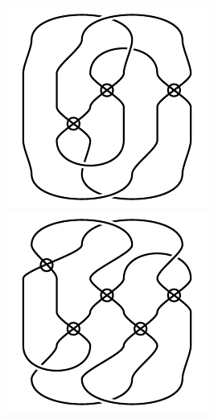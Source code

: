 \begin{figure}[H]
\begin{minipage}[b]{.18\linewidth}
\centering
\includegraphics[width=\linewidth]{../data/virtual_4_32.png}
\end{minipage}
\begin{minipage}[b]{.18\linewidth}
\centering
\includegraphics[width=\linewidth]{../data/virtual_4_33.png}

\end{minipage}
\end{figure}
